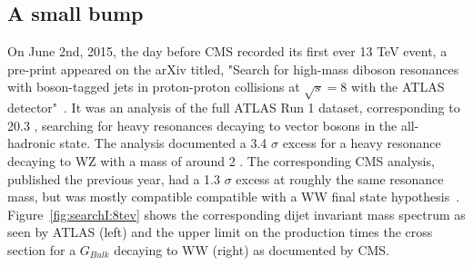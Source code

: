 \subsection{A small bump}
On June 2nd, 2015, the day before CMS recorded its first ever 13 TeV event, a pre-print appeared on the arXiv titled, "Search for high-mass diboson resonances with boson-tagged jets in proton-proton collisions at $\sqrt{s} = 8$ \TeV with the ATLAS detector"~\cite{Aad2015}.
It was an analysis of the full ATLAS Run 1 dataset, corresponding to 20.3 \fbinv, searching for heavy resonances decaying to vector bosons in the all-hadronic state. The analysis documented a 3.4 $\sigma$ excess for a heavy resonance decaying to WZ with a mass of around 2 \TeV.
The corresponding CMS analysis, published the previous year, had a 1.3 $\sigma$ excess at roughly the same resonance mass, but was mostly compatible compatible with a WW final state hypothesis~\cite{Khachatryan:1700394}. Figure~\ref{fig:searchI:8tev} shows the corresponding dijet invariant mass spectrum as seen by ATLAS (left) and the upper limit on the production times the cross section for a $G_{Bulk}$ decaying to WW (right) as documented by CMS.

